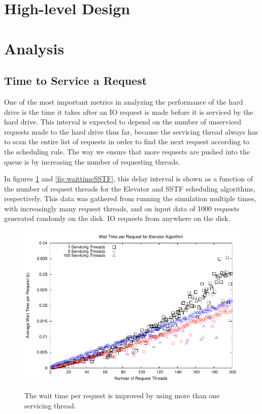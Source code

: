 \documentclass{report}
\begin{document}
\section{High-level Design} %

\newpage
\section{Analysis} %
\subsection{Time to Service a Request}
One of the most important metrics in analyzing the performance of the hard drive is the
time it takes after an IO request is made before it is serviced by the hard drive. This
interval is expected to depend on the number of unserviced requests made to the hard drive
thus far, because the servicing thread always has to scan the entire list of requests in
order to find the next request according to the scheduling rule. The way we ensure that
more requests are pushed into the queue is by increasing the number of requesting threads.

In figures
\ref{fig:waittimeElevator} and \ref{fig:waittimeSSTF}, this delay interval is shown as a 
function of the number of request threads for the Elevator and SSTF scheduling algorithms,
respectively.
This data was gathered from running the simulation multiple times, with increasingly many
request threads, and on input data of 1000 requests generated randomly on the disk.
IO requests from anywhere on the disk. 

\begin{figure}[htb!]
    \centering
    \includegraphics[scale=1]{waittimeElevator.pdf}
    \label{fig:waittimeElevator}
    \caption{The wait time per request is improved by using more than one servicing thread.}
\end{figure}
\end{document}
